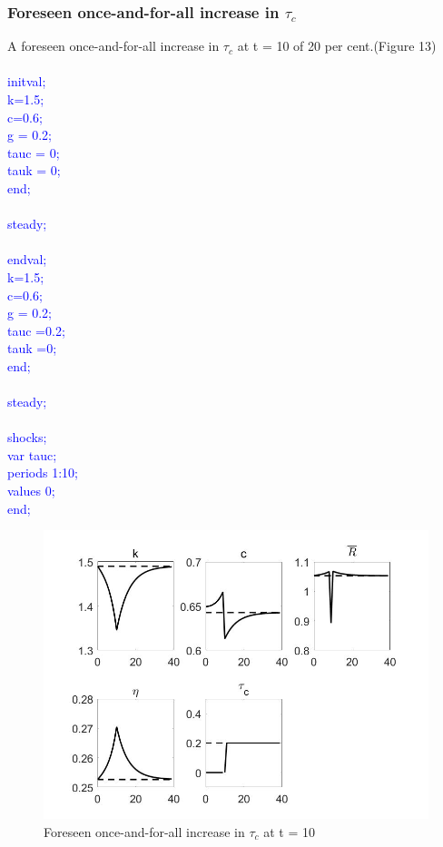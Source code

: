\documentclass[a4paper,12pt]{scrartcl} %
\begin{document}
\subsubsection{Foreseen once-and-for-all increase in $\tau_c$}

A foreseen once-and-for-all increase in $\tau_c$ at t = 10 of 20 per cent.(Figure 13)\\
\\
\textcolor{blue}{
initval;\\
k=1.5;\\
c=0.6;\\
g = 0.2;\\
tauc = 0;\\
tauk = 0;\\
end;\\
\\
steady;\\
\\
endval;\\
k=1.5;\\
c=0.6;\\
g = 0.2;\\
tauc =0.2;\\
tauk =0;\\
end;\\
\\
steady;\\
\\
shocks;\\
var tauc;\\
periods 1:10;\\
values 0;\\
end;}\\

\begin{figure}[htbp!]
		\centering
			\includegraphics[width=0.8\linewidth]{fig13.jpg}
            \caption{Foreseen once-and-for-all increase in $\tau_c$ at t = 10}\label{13}
\end{figure}
\end{document}
